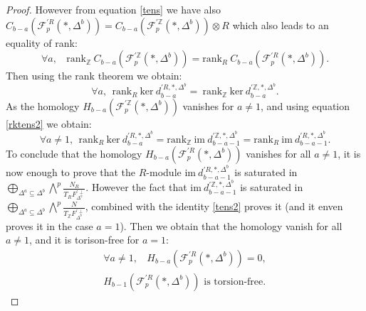 \documentclass{article}
\begin{document}
\begin{proof}
    However from equation \ref{tens} we have also $C_{b-a}(\mathcal{F}_p^{'R}(*,\Delta^b))=C_{b-a}(\mathcal{F}_p^{'\mathbb{Z}}(*,\Delta^b))\otimes R$ which also leads to an equality of rank:
    \begin{equation}
        \forall a,~~~~\mathrm{rank}_{\mathbb{Z}}~C_{b-a}(\mathcal{F}_p^{'\mathbb{Z}}(*,\Delta^b)) = \mathrm{rank}_{R}~C_{b-a}(\mathcal{F}_p^{'R}(*,\Delta^b)).
        \label{rktens3}
    \end{equation}
    Then using the rank theorem we obtain:
    \begin{equation*}
        \forall a,~~\mathrm{rank}_R ~\mathrm{ker}~d^{'R,*,\Delta^b}_{b-a} = ~\mathrm{rank}_{\mathbb{Z}}~\mathrm{ker}~d^{'\mathbb{Z},*,\Delta^b}_{b-a}.
    \end{equation*}
    As the homology $H_{b-a}(\mathcal{F}_p^{'\mathbb{Z}}(*,\Delta^b))$ vanishes for $a\neq1$, and using equation \ref{rktens2} we obtain:
    \begin{equation*}
        \forall a\neq1,~~\mathrm{rank}_R ~\mathrm{ker}~d^{'R,*,\Delta^b}_{b-a} =\mathrm{rank}_{\mathbb{Z}} ~\mathrm{im}~d^{'{\mathbb{Z}},*,\Delta^b}_{b-a-1} = \mathrm{rank}_{R} ~\mathrm{im}~d^{'R,*,\Delta^b}_{b-a-1}.
    \end{equation*}
    To conclude that the homology $H_{b-a}(\mathcal{F}_p^{'R}(*,\Delta^b))$ vanishes for all $a \neq 1$, it is now enough to prove that the $R$-module $\mathrm{im}~d^{'R,*,\Delta^b}_{b-a-1}$ is saturated in $\bigoplus_{\Delta^a \subseteq \Delta^b}\bigwedge^p\frac{N_R}{T_RF^{'\perp}_{\Delta^b}}$. However the fact that $\mathrm{im}~d^{'\mathbb{Z},*,\Delta^b}_{b-a-1}$ is saturated in $\bigoplus_{\Delta^a \subseteq \Delta^b}\bigwedge^p\frac{N}{T_{\mathbb{Z}}F^{'\perp}_{\Delta^b}}$, combined with the identity \ref{tens2} proves it (and it enven proves it in the case $a=1$). Then we obtain that the homology vanish for all $a\neq 1$, and it is torison-free for $a=1$:
    \begin{align*}
        \forall a\neq 1,~~~~H_{b-a}(\mathcal{F}_p^{'R}(*,\Delta^b))=0, \\
        H_{b-1}(\mathcal{F}_p^{'R}(*,\Delta^b)) \text{ is torsion-free}.
    \end{align*}


\end{proof}
\end{document}
